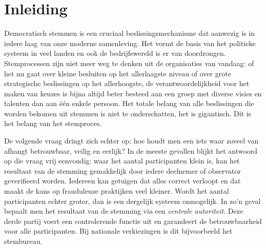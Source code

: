 
\chapter{Inleiding}
\label{ch:inleiding}


Democratisch stemmen is een cruciaal beslissingsmechanisme  dat aanwezig is in iedere laag van onze moderne samenleving. Het vormt  de basis van het politieke systeem in veel landen en ook de bedrijfswereld is er van doordrongen. Stemprocessen zijn niet meer weg te denken uit de organisaties van vandaag: of het nu gaat over kleine besluiten op het allerlaagste niveau of over grote strategische beslissingen op het allerhoogste, de verantwoordelijkheid voor het maken van keuzes is bijna altijd beter besteed aan een groep met diverse visies en talenten dan aan één enkele persoon. Het totale belang van alle beslissingen die worden bekomen uit stemmen is niet te onderschatten, het is gigantisch. Dit is het belang van het stemproces.

De volgende vraag dringt zich echter op: hoe houdt men een iets waar zoveel van afhangt betrouwbaar, veilig en eerlijk? In de meeste gevallen blijkt het antwoord op die vraag vrij eenvoudig: waar het aantal participanten klein is, kan het resultaat van de stemming gemakkelijk door iedere deelnemer of observator geverifieerd worden. Iedereen kan getuigen dat alles correct verloopt en dat maakt de kans op frauduleuze praktijken veel kleiner. Wordt het aantal participanten echter groter, dan is een dergelijk systeem onmogelijk. In zo'n geval bepaalt men het resultaat van de stemming via een \textit{centrale autoriteit}. Deze derde partij voert een controlerende functie uit en garandeert de betrouwbaarheid voor alle participanten. Bij nationale verkiezingen is dit bijvoorbeeld het stembureau. 
\newpage
